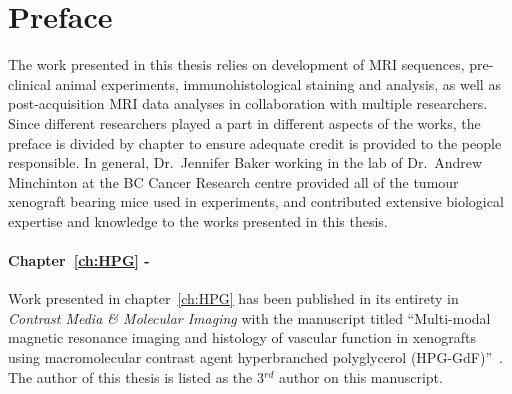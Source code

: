 
\chapter{Preface}
\label{ch:preface}

The work presented in this thesis relies on development of MRI sequences, pre-clinical animal experiments, immunohistological staining and analysis, as well as post-acquisition MRI data analyses in collaboration with multiple researchers.
Since different researchers played a part in different aspects of the works, the preface is divided by chapter to ensure adequate credit is provided to the people responsible.
In general, Dr.\ Jennifer Baker working in the lab of Dr.\ Andrew Minchinton at the BC Cancer Research centre provided all of the tumour xenograft bearing mice used in experiments, and contributed extensive biological expertise and knowledge to the works presented in this thesis.

%

\subsubsection{Chapter~\ref{ch:HPG} - }

Work presented in chapter~\ref{ch:HPG} has been published in its entirety in \emph{Contrast Media \& Molecular Imaging} with the manuscript titled ``Multi-modal magnetic resonance imaging and histology of vascular function in xenografts using macromolecular contrast agent hyperbranched polyglycerol (\acs{HPG-GdF})''~\cite{Baker:2015cob}.
The author of this thesis is listed as the 3$^{rd}$ author on this manuscript.

